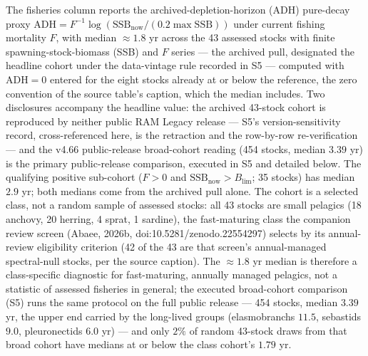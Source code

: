 \documentclass[11pt]{article}
\begin{document}
The fisheries column reports the archived-depletion-horizon (ADH) pure-decay proxy \(\mathrm{ADH} =\allowbreak{} F^{-1}\log(\mathrm{SSB}_{\mathrm{now}}/(0.2\max\mathrm{SSB}))\) under current fishing mortality \(F\), with median \(\approx 1.8\) yr across the 43 assessed stocks with finite spawning-stock-biomass (SSB) and \(F\) series --- the archived pull, designated the headline cohort under the data-vintage rule recorded in S5 --- computed with \(\mathrm{ADH} = 0\) entered for the eight stocks already at or below the reference, the zero convention of the source table's caption, which the median includes. Two disclosures accompany the headline value: the archived 43-stock cohort is reproduced by neither public RAM Legacy release --- S5's version-sensitivity record, cross-referenced here, is the retraction and the row-by-row re-verification --- and the v4.66 public-release broad-cohort reading (454 stocks, median \(3.39\) yr) is the primary public-release comparison, executed in S5 and detailed below. The qualifying positive sub-cohort (\(F > 0\) and \(\mathrm{SSB}_{\mathrm{now}} > B_{\lim}\); 35 stocks) has median \(2.9\) yr; both medians come from the archived pull alone. The cohort is a selected class, not a random sample of assessed stocks: all 43 stocks are small pelagics (18 anchovy, 20 herring, 4 sprat, 1 sardine), the fast-maturing class the companion review screen (Abaee, 2026b, doi:10.5281/\allowbreak{}zenodo.22554297) selects by its annual-review eligibility criterion (42 of the 43 are that screen's annual-managed spectral-null stocks, per the source caption). The \(\approx 1.8\) yr median is therefore a class-specific diagnostic for fast-maturing, annually managed pelagics, not a statistic of assessed fisheries in general; the executed broad-cohort comparison (S5) runs the same protocol on the full public release --- 454 stocks, median \(3.39\) yr, the upper end carried by the long-lived groups (elasmobranchs \(11.5\), sebastids \(9.0\), pleuronectids \(6.0\) yr) --- and only \(2\%\) of random 43-stock draws from that broad cohort have medians at or below the class cohort's \(1.79\) yr.
\end{document}

